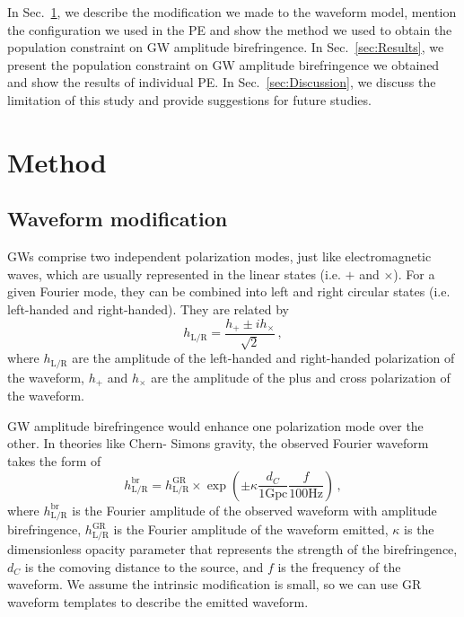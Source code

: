 \documentclass[aps,prd,twocolumn,superscriptaddress,preprintnumbers,floatfix,nofootinbib]{revtex4-2}
\begin{document}
In Sec.~\ref{sec:Method}, we describe the modification we made to the waveform model, mention the configuration we used in the \ac{PE} and show the method we used to obtain the population constraint on \ac{GW} amplitude birefringence.
In Sec.~\ref{sec:Results}, we present the population constraint on \ac{GW} amplitude birefringence we obtained and show the results of individual \ac{PE}.
In Sec.~\ref{sec:Discussion}, we discuss the limitation of this study and provide suggestions for future studies.

\section{Method}
\label{sec:Method}

\subsection{Waveform modification}
GWs comprise two independent polarization modes, just like electromagnetic waves, which are usually represented in the linear states (i.e. $+$ and $\times$).
For a given Fourier mode, they can be combined into left and right circular states (i.e. left-handed and right-handed).
They are related by
\begin{equation}
    h_{\mathrm{L/R}} = \frac{h_+ \pm i h_\times}{\sqrt{2}}\,,
\end{equation}
where $h_{\mathrm{L/R}}$ are the amplitude of the left-handed and right-handed polarization of the waveform, $h_+$ and $h_\times$ are the amplitude of the plus and cross polarization of the waveform.

GW amplitude birefringence would enhance one polarization mode over the other.
In theories like Chern- Simons gravity, the observed Fourier waveform takes the form of
\begin{equation}
    h_\mathrm{L/R}^{\mathrm{br}}=
    h_\mathrm{L/R}^{\mathrm{GR}}\times
    \exp\left(\pm\kappa\frac{d_C}{1\mathrm{Gpc}}\frac{f}{100\mathrm{Hz}}\right)\,,
    \label{eq:waveform_modification}
\end{equation}
where $h_\mathrm{L/R}^{\mathrm{br}}$ is the Fourier amplitude of the observed waveform with amplitude birefringence, $h_\mathrm{L/R}^{\mathrm{GR}}$ is the Fourier amplitude of the waveform emitted, $\kappa$ is the dimensionless opacity parameter that represents the strength of the birefringence, $d_C$ is the comoving distance to the source, and $f$ is the frequency of the waveform.
We assume the intrinsic modification is small, so we can use GR waveform templates to describe the emitted waveform.
\end{document}
